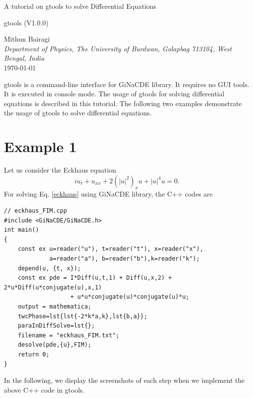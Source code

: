 \documentclass[11pt,a4paper,titlepage]{article}
\begin{document}
\begin{titlepage}
\begin{center}
\Huge {A tutorial on gtools to solve Differential Equations} 
\end{center}
\vspace{3cm}
\begin{center}
\Large{gtools (V1.0.0)}
\end{center}
\vspace{2cm} 
\begin{center} 
Mithun Bairagi \\[3pt]  
\textit{Department of Physics, The University of Burdwan, Golapbag 713104, West Bengal, India} \\ [1cm]
\today
\end{center}
\end{titlepage}
 
\clearpage
gtools is a command-line interface for GiNaCDE library. It requires no GUI tools. It is executed in console mode. 
The usage of gtools for solving differential equations is described in this tutorial. The following two examples demonstrate the usage of gtools to solve differential equations.
\section{Example 1}
Let us consider the Eckhaus equation 
\begin{equation}\label{eckhaus}
	i{u_t} + {u_{xx}} + 2{\left( {{{\left| u \right|}^2}} \right)_x}u + {\left| u \right|^4}u = 0.
\end{equation}
For solving Eq. \eqref{eckhaus} using GiNaCDE library, the C++ codes are\\
\begin{verbatim}
// eckhaus_FIM.cpp
#include <GiNaCDE/GiNaCDE.h>
int main()
{
    const ex u=reader("u"), t=reader("t"), x=reader("x"), 
             a=reader("a"), b=reader("b"),k=reader("k");   
    depend(u, {t, x});
    const ex pde = I*Diff(u,t,1) + Diff(u,x,2) + 2*u*Diff(u*conjugate(u),x,1)
                   + u*u*conjugate(u)*conjugate(u)*u;
    output = mathematica;  
    twcPhase=lst{lst{-2*k*a,k},lst{b,a}};
    paraInDiffSolve=lst{};
    filename = "eckhaus_FIM.txt";
    desolve(pde,{u},FIM);
    return 0;
}
\end{verbatim}
In the following, we display the screenshots of each step when we implement the above C++ code in gtools.
\end{document}
